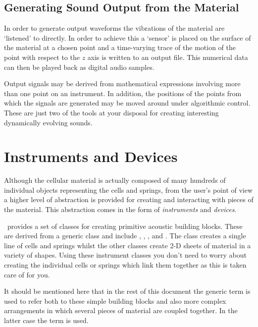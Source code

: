\subsection{Generating Sound Output from the Material}
In order to generate output waveforms the vibrations of the material
are `listened' to directly. In order to achieve this a `sensor' is placed on the
surface of the material at a chosen point and a time-varying trace of
the motion of the point with respect to the $z$ axis is written to an
output file. This numerical data can then be played back as digital
audio samples.

Output signals may be derived from mathematical expressions
involving more than one point on an instrument. In addition, the
positions of the points from which the signals are generated may be moved
around under algorithmic control. These are just two of the tools at
your disposal for creating interesting dynamically evolving sounds.

\section{Instruments and Devices}
\label{section:instruments_and_devices}
Although the cellular material is actually composed of many hundreds of
individual objects representing the cells and springs, from the user's
point of view a higher level of abstraction is provided for creating
and interacting with pieces of the material. This abstraction comes in
the form of \emph{instruments} and
\emph{devices}.

\tao\ provides a set of classes for creating primitive acoustic
building blocks. These are derived from a generic 
class and include , ,
,  and 
. The 
class creates a single line of cells and springs whilst the other
classes create 2-D sheets of material in a variety of shapes. 
Using these instrument classes you don't need to worry about
creating the individual cells or springs which link them together
as this is taken care of for you. 

It should be mentioned here that in the rest of this document the
generic term  is used to refer both to these simple
building blocks and also more complex arrangements in which several pieces of
material are coupled together. In the latter case the term
 is used. 

